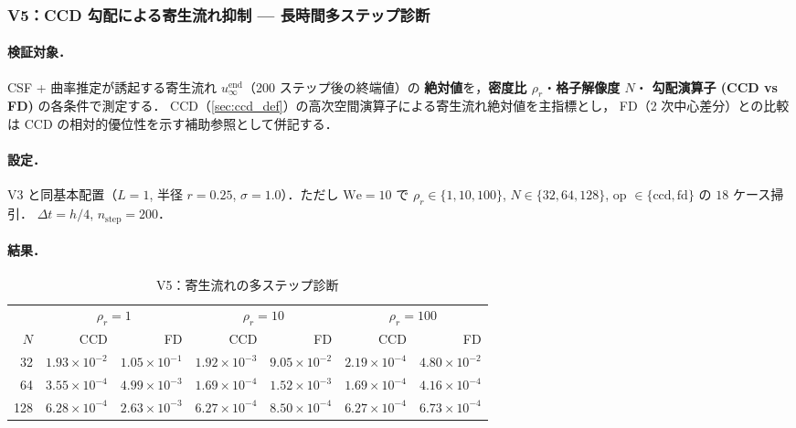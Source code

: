 \FloatBarrier

\subsubsection{V5：CCD 勾配による寄生流れ抑制 — 長時間多ステップ診断}
\label{sec:spurious_multistep}

\paragraph{検証対象．}
CSF + 曲率推定が誘起する寄生流れ $u_\infty^{\mathrm{end}}$（200 ステップ後の終端値）の
\textbf{絶対値}を，\textbf{密度比 $\rho_r$}・\textbf{格子解像度 $N$}・
\textbf{勾配演算子 (CCD vs FD)} の各条件で測定する．
CCD（\autoref{sec:ccd_def}）の高次空間演算子による寄生流れ絶対値を主指標とし，
FD（2 次中心差分）との比較は CCD の相対的優位性を示す補助参照として併記する．

\paragraph{設定．}
V3 と同基本配置（$L=1$, 半径 $r=0.25$, $\sigma=1.0$）．ただし $\mathrm{We} = 10$
で $\rho_r \in \{1, 10, 100\}$, $N \in \{32, 64, 128\}$,
op $\in \{\text{ccd}, \text{fd}\}$ の $18$ ケース掃引．
$\Delta t = h/4$, $n_{\mathrm{step}} = 200$．

\paragraph{結果．}
\begin{table}[!ht]
\caption{V5：寄生流れの多ステップ診断}
\label{tab:V5_spurious}
\centering\small
\begin{tabular}{r r r r r r r}
\toprule
& \multicolumn{2}{c}{$\rho_r=1$} & \multicolumn{2}{c}{$\rho_r=10$} & \multicolumn{2}{c}{$\rho_r=100$} \\
\cmidrule(lr){2-3}\cmidrule(lr){4-5}\cmidrule(lr){6-7}
$N$ & CCD & FD & CCD & FD & CCD & FD \\
\midrule
32  & $1.93\times 10^{-2}$ & $1.05\times 10^{-1}$ & $1.92\times 10^{-3}$ & $9.05\times 10^{-2}$ & $2.19\times 10^{-4}$ & $4.80\times 10^{-2}$ \\
64  & $3.55\times 10^{-4}$ & $4.99\times 10^{-3}$ & $1.69\times 10^{-4}$ & $1.52\times 10^{-3}$ & $1.69\times 10^{-4}$ & $4.16\times 10^{-4}$ \\
128 & $6.28\times 10^{-4}$ & $2.63\times 10^{-3}$ & $6.27\times 10^{-4}$ & $8.50\times 10^{-4}$ & $6.27\times 10^{-4}$ & $6.73\times 10^{-4}$ \\
\bottomrule
\end{tabular}
\end{table}

